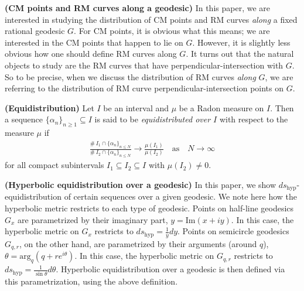 \documentclass[11pt,letterpaper,reqno]{amsart}
\numberwithin{equation}{section}
\numberwithin{figure}{section}
\numberwithin{table}{section}
\begin{document}
\textbf{(CM points and RM curves along a geodesic)} In this paper, we are interested in studying the distribution of CM points and RM curves \textit{along} a fixed rational geodesic $G$. For CM points, it is obvious what this means; we are interested in the CM points that happen to lie on $G$. However, it is slightly less obvious how one should define RM curves along $G$. It turns out that the natural objects to study are the RM curves that have perpendicular-intersection with $G$. So to be precise, when we discuss the distribution of RM curves \textit{along} $G$, we are referring to the distribution of RM curve perpendicular-intersection points on $G$.








\textbf{(Equidistribution)} 
Let $I$ be an interval and $\mu$ be a Radon measure on $I$. Then a sequence $\{\alpha_n\}_{n \ge 1} \subseteq I$ is said to be \textit{equidistributed over $I$} with respect to the measure $\mu$ if 
\begin{align}
    \frac{ 
        \#\, I_1\cap\{\alpha_n\}_{n \le N} 
    }{
        \#\, I_2\cap\{\alpha_n\}_{n \le N}
    } 
    \longrightarrow \frac{\mu(I_1)}{\mu(I_2)}  \quad \text{as}\quad N \to \infty
\end{align}
for all compact subintervals $I_1 \subseteq I_2 \subseteq I$ with $\mu(I_2) \ne 0$.




\textbf{(Hyperbolic equidistribution over a geodesic)} 
In this paper, we show $ds_\text{hyp}$-equidistribution of certain sequences over a given geodesic. We note here how the hyperbolic metric restricts to each type of geodesic.
Points on half-line geodesics $G_x$ are parametrized by their imaginary part, $y = \mathrm{Im} (x+iy)$. In this case, the hyperbolic metric on $G_x$ restricts to $ds_\text{hyp} = \frac{1}{y}dy$.
Points on semicircle geodesics $G_{q,r}$, on the other hand, are parametrized by their arguments (around $q$), $\theta = \mathrm{arg}_q(q+re^{i\theta})$. In this case, the hyperbolic metric on $G_{q,r}$ restricts to $ds_\text{hyp} = \frac{1}{\sin \theta}d\theta$. Hyperbolic equidistribution over a geodesic is then defined via this parametrization, using the above definition.
\end{document}
